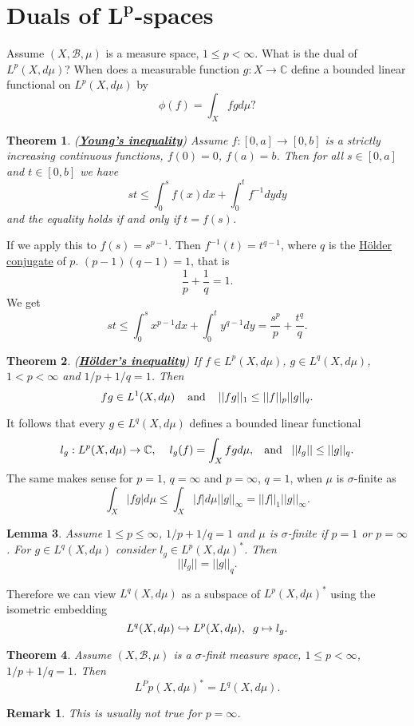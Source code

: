 \documentclass{article}
\newtheorem{theorem}{Theorem}[section]
\newtheorem{lemma}[theorem]{Lemma}
\newtheorem*{remark}{Remark}
\theoremstyle{definition}
\newcommand{\C}{\mathbb{C}}
\newcommand{\B}{\mathscr{B}}
\begin{document}
\section{Duals of $\mathbf{L^p}$-spaces}
Assume $(X,\B,\mu)$ is a measure space, $1\leq p<\infty$. What is the dual of 
$L^p(X,d\mu)$? When does a measurable function $g:X\rightarrow \C$ define a bounded linear functional on $L^p(X,d\mu)$ by 
$$\phi(f)=\int_X fgd\mu?$$

\begin{theorem}(\underline{\textbf{Young's inequality}})
    Assume $f:[0,a]\rightarrow [0,b]$ is a strictly increasing continuous functions, $f(0)=0$, $f(a)=b$. Then for all $s\in[0,a]$ and $t\in[0,b]$
    we have $$st\leq \int_0^s f(x)dx + \int_0^t f^{-1}dy dy$$
    and the equality holds if and only if $t=f(s)$.
    
\end{theorem}
If we apply this to $f(s)=s^{p-1}$. Then $f^{-1}(t)=t^{q-1}$, where $q$ is the \underline{Hölder conjugate} of $p$. $(p-1)(q-1)=1$, that is $$\frac{1}{p}+\frac{1}{q}=1.$$
We get $$st \leq \int_0^s x^{p-1}dx + \int_0^t y^{q-1}dy = \frac{s^p}{p}+\frac{t^q}{q}.$$
\begin{theorem}(\underline{\textbf{Hölder's inequality}})
    If $f\in L^p(X,d\mu)$, $g\in L^q(X,d\mu)$, $1<p<\infty$ and $1/p + 1/q = 1$. Then 
    $$fg \in L^1(X,d\mu)\hspace{4mm}\text{and}\hspace{4mm} ||fg||_1 \leq ||f||_p||g||_q.$$
\end{theorem}
It follows that every $g\in L^q(X,d\mu)$ defines a bounded linear functional 
$$l_g:L^p(X,d\mu)\rightarrow \C,\hspace{4mm} l_g(f) = \int_X fg d\mu,\hspace*{3mm}\text{and}\hspace{3mm} ||l_g||\leq ||g||_q.$$
The same makes sense for $p=1$, $q=\infty$ and $p=\infty$, $q=1$, when $\mu$ is $\sigma$-finite as 
$$\int_X|fg|d\mu\leq \int_X|f|d\mu ||g||_\infty = ||f||_1||g||_\infty.$$

\begin{lemma}
    Assume $1\leq p\leq\infty$, $1/p + 1/q = 1$ and $\mu$ is $\sigma$-finite if $p=1$ or $p=\infty$. For $g\in L^q(X,d\mu)$ consider $l_g\in L^p(X,d\mu)^*$. Then 
    $$||l_g|| = ||g||_q.$$
\end{lemma}
Therefore we can view $L^q(X,d\mu)$ as a subspace of $L^p(X,d\mu)^*$ using the isometric embedding
$$L^q(X,d\mu)\hookrightarrow L^p(X,d\mu),\hspace{2mm}g\mapsto l_g.$$ 
\begin{theorem}
    Assume $(X,\B,\mu)$ is a $\sigma$-finit measure space, $1\leq p<\infty$, $1/p+1/q=1$. Then 
    $$L^Pp(X,d\mu)^* = L^q(X,d\mu).$$
\end{theorem}
\begin{remark}
    This is usually not true for $p=\infty$.
\end{remark}
\end{document}
